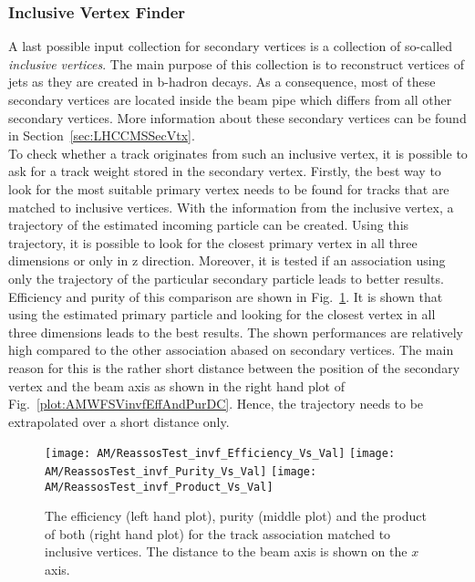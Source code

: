 \subsubsection{Inclusive Vertex Finder \label{sec:AMWFSVivf}}

A last possible input collection for secondary vertices is a collection of so-called \textit{inclusive vertices}. The main purpose of this collection is to reconstruct vertices of jets as they are created in b-hadron decays. As a consequence, most of these secondary vertices are located inside the beam pipe which differs from all other secondary vertices. More information about these secondary vertices can be found in Section~\ref{sec:LHCCMSSecVtx}. \\
To check whether a track originates from such an inclusive vertex, it is possible to ask for a track weight stored in the secondary vertex. Firstly, the best way to look for the most suitable primary vertex needs to be found for tracks that are matched to inclusive vertices. With the information from the inclusive vertex, a trajectory of the estimated incoming particle can be created. Using this trajectory, it is possible to look for the closest primary vertex in all three dimensions or only in z direction. Moreover, it is tested if an association using only the trajectory of the particular secondary particle leads to better results. Efficiency and purity of this comparison are shown in Fig.~\ref{plot:AMWFSVinvfEffAndPurSO}. It is shown that using the estimated primary particle and looking for the closest vertex in all three dimensions leads to the best results. The shown performances are relatively high compared to the other association abased on secondary vertices. The main reason for this is the rather short distance between the position of the secondary vertex and the beam axis as shown in the right hand plot of Fig.~\ref{plot:AMWFSVinvfEffAndPurDC}. Hence, the trajectory needs to be extrapolated over a short distance only.

\begin{figure}[!ht]
    \centering
    \texttt{[image: AM/ReassosTest\_invf\_Efficiency\_Vs\_Val]}
    \texttt{[image: AM/ReassosTest\_invf\_Purity\_Vs\_Val]}
    \texttt{[image: AM/ReassosTest\_invf\_Product\_Vs\_Val]}
    \caption[Efficiency, purity and their product of the association with inclusive vertices for different search options as a function of distance to the beam axis]{The efficiency (left hand plot), purity (middle plot) and the product of both (right hand plot) for the track association matched to inclusive vertices. The distance to the beam axis is shown on the $x$ axis.\label{plot:AMWFSVinvfEffAndPurSO}}
\end{figure}

